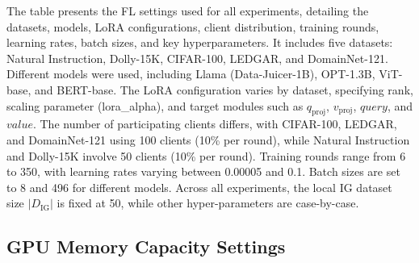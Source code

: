 \documentclass[sigconf]{acmart}
\begin{document}


    The table presents the FL settings used for all experiments, detailing the datasets, models, LoRA configurations, client distribution, training rounds, learning rates, batch sizes, and key hyperparameters. It includes five datasets: Natural Instruction, Dolly-15K, CIFAR-100, LEDGAR, and DomainNet-121. Different models were used, including Llama (Data-Juicer-1B), OPT-1.3B, ViT-base, and BERT-base. The LoRA configuration varies by dataset, specifying rank, scaling parameter (lora\_alpha), and target modules such as $q_{\text{proj}}$, $v_{\text{proj}}$, $query$, and $value$. The number of participating clients differs, with CIFAR-100, LEDGAR, and DomainNet-121 using 100 clients (10\% per round), while Natural Instruction and Dolly-15K involve 50 clients (10\% per round). Training rounds range from 6 to 350, with learning rates varying between 0.00005 and 0.1. Batch sizes are set to 8 and 496 for different models. 
    Across all experiments, the local IG dataset size $|D_{\text{IG}}|$ is fixed at 50, while other hyper-parameters are case-by-case.

    \subsection{GPU Memory Capacity Settings}\label{subsec:appendix-capacity-settings}
\end{document}
